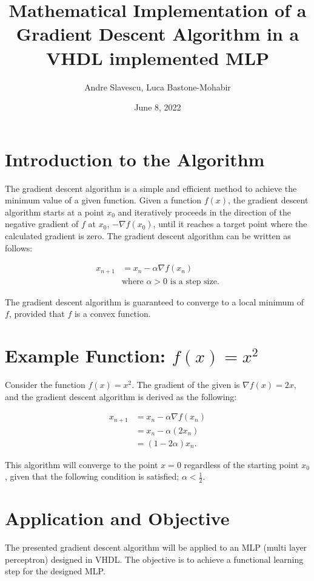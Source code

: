 \documentclass{article}
\title{Mathematical Implementation of a Gradient Descent Algorithm in a VHDL implemented MLP}
\author{Andre Slavescu, Luca Bastone-Mohabir}
\date{June 8, 2022}
\begin{document}
\maketitle

\section{Introduction to the Algorithm}

The gradient descent algorithm is a simple and efficient method to achieve the minimum value of a given function. Given a function $f(x)$, the gradient descent algorithm starts at a point $x_0$ and iteratively proceeds in the direction of the negative gradient of $f$ at $x_0$, $-\nabla f(x_0)$, until it reaches a target point where the calculated gradient is zero. The gradient descent algorithm can be written as follows:

\begin{align*}
x_{n+1} &= x_n - \alpha \nabla f(x_n) \\
& \text{where } \alpha > 0 \text{ is a step size.}
\end{align*}

The gradient descent algorithm is guaranteed to converge to a local minimum of $f$, provided that $f$ is a convex function.

\section{Example Function: $f(x)=x^2$}

Consider the function $f(x) = x^2$. The gradient of the given is $\nabla f(x) = 2x$, and the gradient descent algorithm is derived as the following:

\begin{align*}
x_{n+1} &= x_n - \alpha \nabla f(x_n) \\
&= x_n - \alpha (2x_n) \\
&= (1 - 2\alpha)x_n.
\end{align*}

This algorithm will converge to the point $x=0$ regardless of the starting point $x_0$, given that the following condition is satisfied; $\alpha < \frac{1}{2}$.

\section{Application and Objective}

The presented gradient descent algorithm will be applied to an MLP (multi layer perceptron) designed in VHDL. The objective is to achieve a functional learning step for the designed MLP.
\end{document}
